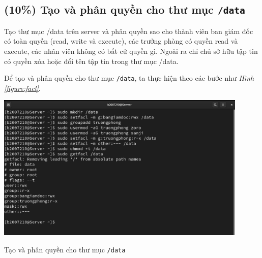 \documentclass[a4paper, 11pt]{article}
\begin{document}
\subsection{(10\%) Tạo và phân quyền cho thư mục \texttt{/data}}

Tạo thư mục /data trên server và phân quyền sao cho thành viên ban giám đốc có toàn quyền (read, write và execute), các trưởng phòng có quyền read và execute, các nhân viên không có bất cứ quyền gì. Ngoài ra chỉ chủ sở hữu tập tin có quyền xóa hoặc đổi tên tập tin trong thư mục /data.


Để tạo và phân quyền cho thư mục \texttt{/data}, ta thực hiện theo các bước như \textit{Hình \ref{figure:facl}}.

\begin{minipage}
    {\linewidth}
    \captionsetup{type=figure}
    \centering
    \includegraphics[width=12cm]{images/facl.png}
    \caption{Tạo và phân quyền cho thư mục \texttt{/data}}
    \label{figure:facl}
\end{minipage}
\end{document}
